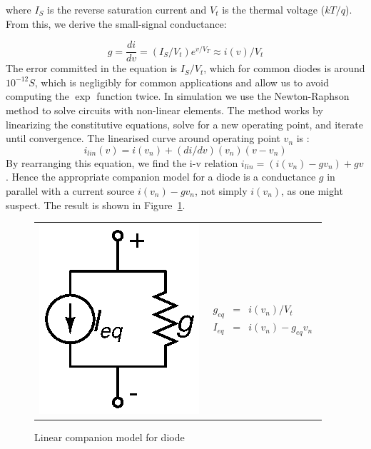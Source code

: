 \documentclass{article}
\begin{document}
where $I_S$ is the reverse saturation current and $V_t$ is the thermal voltage ($kT/q$).  From this, we derive the small-signal conductance:

\begin{equation}
g = \frac{di}{dv} = (I_S/V_t) e^{v/V_T} \approx i(v)/V_t
\end{equation}
The error committed in the equation is $I_S / V_t$, which for common diodes is around $10^{-12} S$, which is negligibly for common applications and allow us to avoid computing the $\exp$ function twice.
In simulation we use the Newton-Raphson method to solve circuits with non-linear elements. The method works by linearizing the constitutive equations, solve for a new operating point, and iterate until convergence. The linearised curve around operating point $v_n$ is :
\begin{equation}
i_{lin}(v) = i(v_n) + (di/dv)(v_n) (v - v_n)
\end{equation}
By rearranging this equation, we find the i-v relation $i_{lin}=(i(v_n)-gv_n)+gv$.  Hence the appropriate companion model for a diode is a conductance $g$ in parallel with a current source $i(v_n)-gv_n$, not simply $i(v_n)$, as one might suspect.  The result is shown in Figure~\ref{fig:diode}.


\begin{figure}[h]
\begin{center}
\begin{tabular}{m{3cm}<{\centering}m{3cm}<{\centering}}
	\includegraphics{fig/diode.eps} & 
	\begin{eqnarray*}
		g_{eq}&=&i(v_n)/V_t \\
		I_{eq}&=&i(v_n)-g_{eq}v_n
	\end{eqnarray*}
\end{tabular}
\caption{Linear companion model for diode \label{fig:diode}}
\end{center}
\end{figure}
\end{document}

